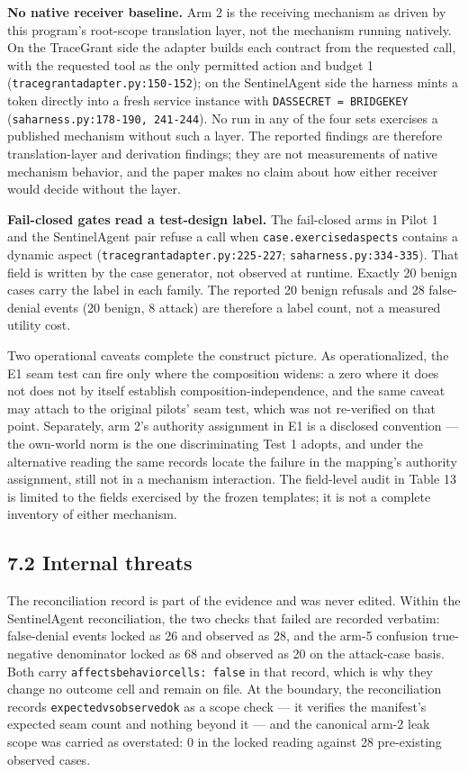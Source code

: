 \documentclass[
  10pt,
]{article}
\let\origtexttt\texttt
\renewcommand{\texttt}[1]{{\upshape\origtexttt{#1}}}
\renewcommand{\_}{\allowbreak\origunderscore}
\begin{document}
\textbf{No native receiver baseline.} Arm 2 is the receiving mechanism
as driven by this program's root-scope translation layer, not the
mechanism running natively. On the TraceGrant side the adapter builds
each contract from the requested call, with the requested tool as the
only permitted action and budget 1
(\texttt{tracegrant\_adapter.py:150-152}); on the SentinelAgent side the
harness mints a token directly into a fresh service instance with
\texttt{DAS\_SECRET\ =\ BRIDGE\_KEY}
(\texttt{sa\_harness.py:178-190,\ 241-244}). No run in any of the four
sets exercises a published mechanism without such a layer. The reported
findings are therefore translation-layer and derivation findings; they
are not measurements of native mechanism behavior, and the paper makes
no claim about how either receiver would decide without the layer.

\textbf{Fail-closed gates read a test-design label.} The fail-closed
arms in Pilot 1 and the SentinelAgent pair refuse a call when
\texttt{case.exercised\_aspects} contains a dynamic aspect
(\texttt{tracegrant\_adapter.py:225-227};
\texttt{sa\_harness.py:334-335}). That field is written by the case
generator, not observed at runtime. Exactly 20 benign cases carry the
label in each family. The reported 20 benign refusals and 28
false-denial events (20 benign, 8 attack) are therefore a label count,
not a measured utility cost.

Two operational caveats complete the construct picture. As
operationalized, the E1 seam test can fire only where the composition
widens: a zero where it does not does not by itself establish
composition-independence, and the same caveat may attach to the original
pilots' seam test, which was not re-verified on that point. Separately,
arm 2's authority assignment in E1 is a disclosed convention --- the
own-world norm is the one discriminating Test 1 adopts, and under the
alternative reading the same records locate the failure in the mapping's
authority assignment, still not in a mechanism interaction. The
field-level audit in Table 13 is limited to the fields exercised by the
frozen templates; it is not a complete inventory of either mechanism.

\subsection{7.2 Internal threats}\label{internal-threats}

The reconciliation record is part of the evidence and was never edited.
Within the SentinelAgent reconciliation, the two checks that failed are
recorded verbatim: false-denial events locked as 26 and observed as 28,
and the arm-5 confusion true-negative denominator locked as 68 and
observed as 20 on the attack-case basis. Both carry
\texttt{affects\_behavior\_cells:\ false} in that record, which is why
they change no outcome cell and remain on file. At the boundary, the
reconciliation records \texttt{expected\_vs\_observed\_ok} as a scope
check --- it verifies the manifest's expected seam count and nothing
beyond it --- and the canonical arm-2 leak scope was carried as
overstated: 0 in the locked reading against 28 pre-existing observed
cases.
\end{document}
